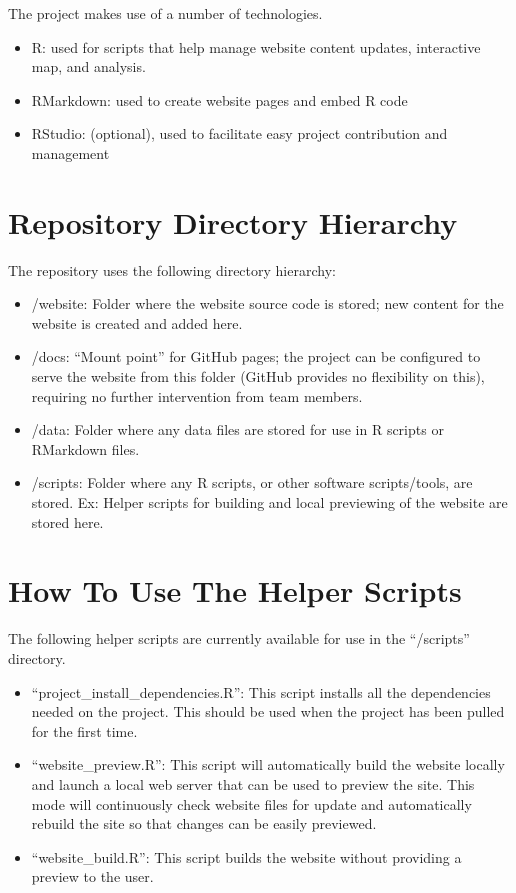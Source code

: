 \documentclass[
]{book}
\providecommand{\tightlist}{%
  \setlength{\itemsep}{0pt}\setlength{\parskip}{0pt}}
\begin{document}
The project makes use of a number of technologies.

\begin{itemize}
\tightlist
\item
  R: used for scripts that help manage website content updates, interactive map, and analysis.
\item
  RMarkdown: used to create website pages and embed R code
\item
  RStudio: (optional), used to facilitate easy project contribution and management
\end{itemize}

\hypertarget{repository-directory-hierarchy}{%
\section{Repository Directory Hierarchy}\label{repository-directory-hierarchy}}

The repository uses the following directory hierarchy:

\begin{itemize}
\tightlist
\item
  /website: Folder where the website source code is stored; new content for the website is created and added here.
\item
  /docs: ``Mount point'' for GitHub pages; the project can be configured to serve the website from this folder (GitHub provides no flexibility on this), requiring no further intervention from team members.
\item
  /data: Folder where any data files are stored for use in R scripts or RMarkdown files.
\item
  /scripts: Folder where any R scripts, or other software scripts/tools, are stored. Ex: Helper scripts for building and local previewing of the website are stored here.
\end{itemize}

\hypertarget{how-to-use-the-helper-scripts}{%
\section{How To Use The Helper Scripts}\label{how-to-use-the-helper-scripts}}

The following helper scripts are currently available for use in the ``/scripts'' directory.

\begin{itemize}
\tightlist
\item
  ``project\_install\_dependencies.R'': This script installs all the dependencies needed on the project. This should be used when the project has been pulled for the first time.
\item
  ``website\_preview.R'': This script will automatically build the website locally and launch a local web server that can be used to preview the site. This mode will continuously check website files for update and automatically rebuild the site so that changes can be easily previewed.
\item
  ``website\_build.R'': This script builds the website without providing a preview to the user.
\end{itemize}
\end{document}
